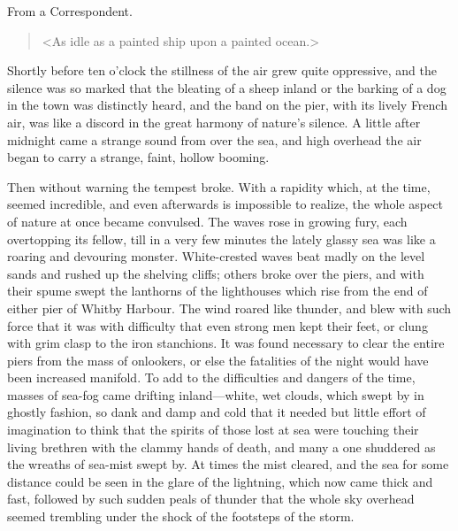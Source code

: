 \begin{newspaper}{}{From a Correspondent.}
\begin{quote}
<As idle as a painted ship upon a painted ocean.>
\end{quote}

Shortly before ten o'clock the stillness of the air grew quite oppressive, and the silence was so marked that the bleating of a sheep inland or the barking of a dog in the town was distinctly heard, and the band on the pier, with its lively French air, was like a discord in the great harmony of nature's silence. A little after midnight came a strange sound from over the sea, and high overhead the air began to carry a strange, faint, hollow booming.

Then without warning the tempest broke. With a rapidity which, at the time, seemed incredible, and even afterwards is impossible to realize, the whole aspect of nature at once became convulsed. The waves rose in growing fury, each overtopping its fellow, till in a very few minutes the lately glassy sea was like a roaring and devouring monster. White-crested waves beat madly on the level sands and rushed up the shelving cliffs; others broke over the piers, and with their spume swept the lanthorns of the lighthouses which rise from the end of either pier of Whitby Harbour. The wind roared like thunder, and blew with such force that it was with difficulty that even strong men kept their feet, or clung with grim clasp to the iron stanchions. It was found necessary to clear the entire piers from the mass of onlookers, or else the fatalities of the night would have been increased manifold. To add to the difficulties and dangers of the time, masses of sea-fog came drifting inland—white, wet clouds, which swept by in ghostly fashion, so dank and damp and cold that it needed but little effort of imagination to think that the spirits of those lost at sea were touching their living brethren with the clammy hands of death, and many a one shuddered as the wreaths of sea-mist swept by. At times the mist cleared, and the sea for some distance could be seen in the glare of the lightning, which now came thick and fast, followed by such sudden peals of thunder that the whole sky overhead seemed trembling under the shock of the footsteps of the storm.


\end{newspaper}
